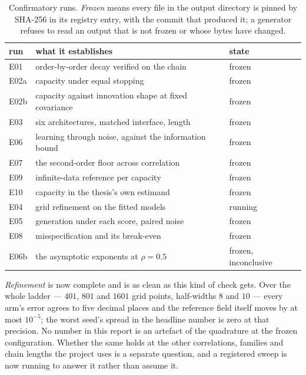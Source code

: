 \documentclass[11pt,a4paper]{article}
\begin{document}
\begin{table}[htbp]
\centering
\small
\caption{Confirmatory runs. \emph{Frozen} means every file in the output directory is pinned by
SHA-256 in its registry entry, with the commit that produced it; a generator refuses to read an
output that is not frozen or whose bytes have changed.}
\label{tab:status}
\begin{tabular}{l l l}
\toprule
run & what it establishes & state \\
\midrule
E01  & order-by-order decay verified on the chain              & frozen \\
E02a & capacity under equal stopping                            & frozen \\
E02b & capacity against innovation shape at fixed covariance    & frozen \\
E03  & six architectures, matched interface, length             & frozen \\
E06  & learning through noise, against the information bound    & frozen \\
E07  & the second-order floor across correlation                & frozen \\
E09  & infinite-data reference per capacity                     & frozen \\
\midrule
E10  & capacity in the thesis's own estimand                    & frozen \\
E04  & grid refinement on the fitted models                     & running \\
E05  & generation under each score, paired noise                & frozen \\
E08  & misspecification and its break-even                      & frozen \\
E06b & the asymptotic exponents at $\rho=0.5$                   & frozen, inconclusive \\
\bottomrule
\end{tabular}
\end{table}

\emph{Refinement} is now complete and is as clean as this kind of check gets. Over the whole ladder
--- $401$, $801$ and $1601$ grid points, half-widths $8$ and $10$ --- every arm's error agrees to
five decimal places and the reference field itself moves by at most $10^{-5}$; the worst seed's
spread in the headline number is zero at that precision. No number in this report is an artefact of
the quadrature at the frozen configuration. Whether the same holds at the other correlations,
families and chain lengths the project uses is a separate question, and a registered sweep is now
running to answer it rather than assume it.
\end{document}

